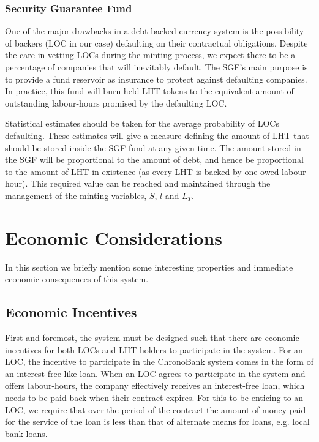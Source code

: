 \begin{multicols}{2}
\subsubsection{Security Guarantee Fund}
\label{sec:insurance}

One of the major drawbacks in a debt-backed currency system is the possibility of backers (LOC in our case) defaulting on their contractual obligations. Despite the care in vetting LOCs during the minting process, we expect there to be a percentage of companies that will inevitably default. The SGF's main purpose is to provide a fund reservoir as insurance to protect against defaulting companies. In practice, this fund will burn held LHT tokens to the equivalent amount of outstanding labour-hours promised by the defaulting LOC.  

Statistical estimates should be taken for the average probability of LOCs defaulting. These estimates will give a measure defining the amount of LHT that should be stored inside the SGF fund at any given time. The amount stored in the SGF will be proportional to the amount of debt, and hence be proportional to the amount of LHT in existence (as every LHT is backed by one owed labour-hour). This required value can be reached and maintained through the management of the minting variables, $S$, $l$ and $L_T$. 

\section{Economic Considerations}
\label{sec:economic-considerations}

In this section we briefly mention some interesting properties and immediate economic consequences of this system.


\subsection{Economic Incentives}
First and foremost, the system must be designed such that there are economic incentives for both LOCs and LHT holders to participate in the system. For an LOC, the incentive to participate in the ChronoBank system comes in the form of an interest-free-like loan. When an LOC agrees to participate in the system and offers labour-hours, the company effectively receives an interest-free loan, which needs to be paid back when their contract expires. For this to be enticing to an LOC, we require that over the period of the contract the amount of money paid for the service of the loan is less than that of alternate means for loans, e.g. local bank loans. 


\end{multicols}
